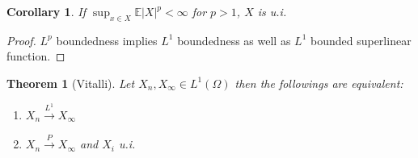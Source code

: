 \documentclass[a4paper,11pt]{book}
\newtheorem{theorem}{Theorem}[section]
\newtheorem{corollary}{Corollary}[theorem]
\theoremstyle{definition}
\theoremstyle{remark}
\begin{document}
\begin{corollary}
	If  $\sup_{x \in X} \mathbb{E}|X|^p < \infty$ for $p > 1$, $X$ is u.i.
\end{corollary}
\begin{proof}
	$L^p$ boundedness implies $L^1$ boundedness as well as $L^1$ bounded superlinear function.
\end{proof}

\begin{theorem}[Vitalli]
Let $X_n, X_\infty \in L^1(\Omega)$ then the followings are equivalent:
\begin{enumerate}
	\item $X_n \overset{L^1}{\rightarrow} X_\infty$
	\item $X_n \overset{P}{\rightarrow} X_\infty$ and $X_i$ u.i.
\end{enumerate}
\end{theorem}
\end{document}
